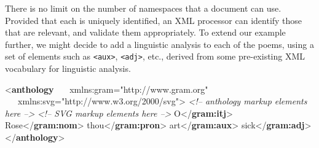 There is no limit on the number of namespaces that a document can use. Provided that each is uniquely identified, an XML processor can identify those that are relevant, and validate them appropriately. To extend our example further, we might decide to add a linguistic analysis to each of the poems, using a set of elements such as \texttt{<aux>}, \texttt{<adj>}, etc., derived from some pre-existing XML vocabulary for linguistic analysis. \par\bgroup\exampleFont \begin{shaded}\noindent\mbox{}{<\textbf{anthology}\mbox{}\newline 
   xmlns:gram="http://www.gram.org"\mbox{}\newline 
   xmlns:svg="http://www.w3.org/2000/svg">}\mbox{}\newline 
\hspace*{1em}\mbox{}\newline 
\textit{<!-- anthology markup elements here -->}\mbox{}\newline 
{}\mbox{}\newline 
\textit{<!-- SVG markup elements here -->}\mbox{}\newline 
{}\mbox{}\newline 
{}\mbox{}\newline 
\hspace*{1em}O{</\textbf{gram:itj}>}\mbox{}\newline 
\hspace*{1em}Rose{</\textbf{gram:nom}>}\mbox{}\newline 
\hspace*{1em}thou{</\textbf{gram:pron}>}\mbox{}\newline 
\hspace*{1em}art{</\textbf{gram:aux}>}\mbox{}\newline 
\hspace*{1em}sick{</\textbf{gram:adj}>}\mbox{}\newline 
{}\mbox{}\newline 
{</\textbf{anthology}>}\end{shaded}\egroup\par 
